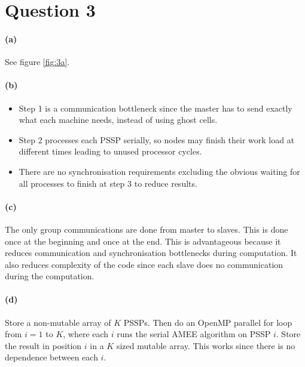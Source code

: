 \documentclass{article}
\begin{document}
\section*{Question 3}

\paragraph{(a)}
See figure \ref{fig:3a}.

\paragraph{(b)}
\begin{itemize}
\item Step 1 is a communication bottleneck since the master has to send
  exactly what each machine needs, instead of using ghost cells.
\item Step 2 processes each PSSP serially, so nodes may finish their work load
  at different times leading to unused processor cycles.
\item There are no synchronisation requirements excluding the obvious waiting
  for all processes to finish at step 3 to reduce results.
\end{itemize}

\paragraph{(c)}
The only group communications are done from master to slaves. This is done
once at the beginning and once at the end. This is advantageous because it
reduces communication and synchronisation bottlenecks during computation. It
also reduces complexity of the code since each slave does no communication
during the computation.

\paragraph{(d)}
Store a non-mutable array of $K$ PSSPs. Then do an OpenMP parallel for loop
from $i=1$ to $K$, where each $i$ runs the serial AMEE algorithm on PSSP
$i$. Store the result in position $i$ in a $K$ sized mutable array. This works
since there is no dependence between each $i$.
\end{document}
